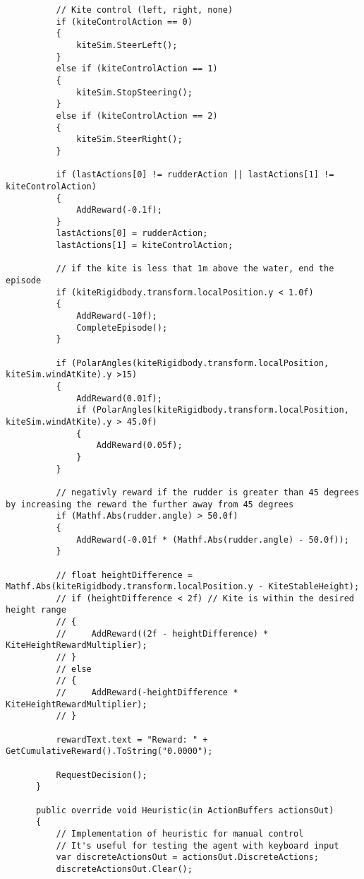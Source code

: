 \begin{lstlisting}
          // Kite control (left, right, none)
          if (kiteControlAction == 0)
          {
              kiteSim.SteerLeft();
          }
          else if (kiteControlAction == 1)
          {
              kiteSim.StopSteering();
          }
          else if (kiteControlAction == 2)
          {
              kiteSim.SteerRight();
          }
  
          if (lastActions[0] != rudderAction || lastActions[1] != kiteControlAction)
          {
              AddReward(-0.1f);
          }
          lastActions[0] = rudderAction;
          lastActions[1] = kiteControlAction;
  
          // if the kite is less that 1m above the water, end the episode
          if (kiteRigidbody.transform.localPosition.y < 1.0f)
          {
              AddReward(-10f);
              CompleteEpisode();
          }
  
          if (PolarAngles(kiteRigidbody.transform.localPosition, kiteSim.windAtKite).y >15)
          {
              AddReward(0.01f);
              if (PolarAngles(kiteRigidbody.transform.localPosition, kiteSim.windAtKite).y > 45.0f)
              {
                  AddReward(0.05f);
              }
          }
  
          // negativly reward if the rudder is greater than 45 degrees by increasing the reward the further away from 45 degrees
          if (Mathf.Abs(rudder.angle) > 50.0f)
          {
              AddReward(-0.01f * (Mathf.Abs(rudder.angle) - 50.0f));
          }
  
          // float heightDifference = Mathf.Abs(kiteRigidbody.transform.localPosition.y - KiteStableHeight);
          // if (heightDifference < 2f) // Kite is within the desired height range
          // {
          //     AddReward((2f - heightDifference) * KiteHeightRewardMultiplier);
          // }
          // else
          // {
          //     AddReward(-heightDifference * KiteHeightRewardMultiplier);
          // }
  
          rewardText.text = "Reward: " + GetCumulativeReward().ToString("0.0000");
  
          RequestDecision();
      }
  
      public override void Heuristic(in ActionBuffers actionsOut)
      {
          // Implementation of heuristic for manual control
          // It's useful for testing the agent with keyboard input
          var discreteActionsOut = actionsOut.DiscreteActions;
          discreteActionsOut.Clear();
  

\end{lstlisting}
